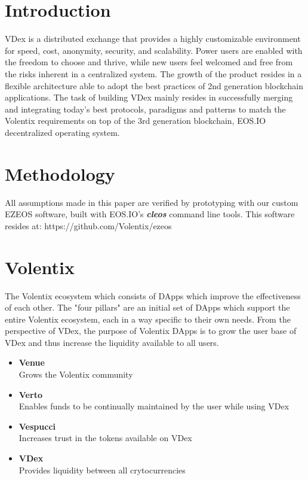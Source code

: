 \documentclass[]{article}
\begin{document}
{\section{Introduction}

VDex is a distributed exchange that provides a highly customizable environment for speed, cost, anonymity, security, and scalability. 
Power users are enabled with the freedom to choose and thrive, 
while new users feel welcomed and free from the risks inherent in a centralized system. 
The growth of the product resides in a flexible architecture 
able to adopt the best practices of 2nd generation blockchain applications.  
The task of building VDex mainly resides in successfully merging
and integrating today's best protocols, paradigms and patterns to match the 
Volentix requirements on top of the 3rd generation blockchain, EOS.IO decentralized operating system.

 	
\section{Methodology}

All assumptions made in this paper are verified by prototyping with our custom EZEOS software, built
with EOS.IO's \textbf{\textit{cleos}} command line tools. This software resides at: https://github.com/Volentix/ezeos

\section{Volentix}	
The Volentix ecosystem which consists of DApps which improve the effectiveness of each other.
The "four pillars" are an initial set of DApps which support the entire Volentix ecosystem,
each in a way specific to their own needs.
From the perspective of VDex, the purpose of Volentix DApps is to grow the user base of VDex
and thus increase the liquidity available to all users.\\
\begin{itemize}
\item \textbf{Venue}\\ Grows the Volentix community
\item \textbf{Verto}\\ Enables funds to be continually maintained by the user while using VDex
\item \textbf{Vespucci}\\ Increases trust in the tokens available on VDex
\item \textbf{VDex}\\ Provides liquidity between all crytocurrencies
\end{itemize}

}
\end{document}
